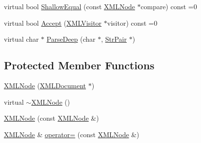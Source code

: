 \begin{DoxyCompactItemize}
\item 
virtual bool \hyperlink{classtinyxml2_1_1_x_m_l_node_a7ce18b751c3ea09eac292dca264f9226}{Shallow\-Equal} (const \hyperlink{classtinyxml2_1_1_x_m_l_node}{X\-M\-L\-Node} $\ast$compare) const =0
\item 
virtual bool \hyperlink{classtinyxml2_1_1_x_m_l_node_a81e66df0a44c67a7af17f3b77a152785}{Accept} (\hyperlink{classtinyxml2_1_1_x_m_l_visitor}{X\-M\-L\-Visitor} $\ast$visitor) const =0
\item 
virtual char $\ast$ \hyperlink{classtinyxml2_1_1_x_m_l_node_a7610d0f603e8b603d2078521811a23c1}{Parse\-Deep} (char $\ast$, \hyperlink{classtinyxml2_1_1_str_pair}{Str\-Pair} $\ast$)
\end{DoxyCompactItemize}
\subsection*{Protected Member Functions}
\begin{DoxyCompactItemize}
\item 
\hyperlink{classtinyxml2_1_1_x_m_l_node_a29868df6ca383d574f584dfdd15105b6}{X\-M\-L\-Node} (\hyperlink{classtinyxml2_1_1_x_m_l_document}{X\-M\-L\-Document} $\ast$)
\item 
virtual \hyperlink{classtinyxml2_1_1_x_m_l_node_a8f41e898cdd4da4cdbb7f05b0c7d9f69}{$\sim$\-X\-M\-L\-Node} ()
\item 
\hyperlink{classtinyxml2_1_1_x_m_l_node_a78be01384518a969da905548f318d75b}{X\-M\-L\-Node} (const \hyperlink{classtinyxml2_1_1_x_m_l_node}{X\-M\-L\-Node} \&)
\item 
\hyperlink{classtinyxml2_1_1_x_m_l_node}{X\-M\-L\-Node} \& \hyperlink{classtinyxml2_1_1_x_m_l_node_ade79231d908e1f21862819e00e56ab6e}{operator=} (const \hyperlink{classtinyxml2_1_1_x_m_l_node}{X\-M\-L\-Node} \&)
\end{DoxyCompactItemize}
